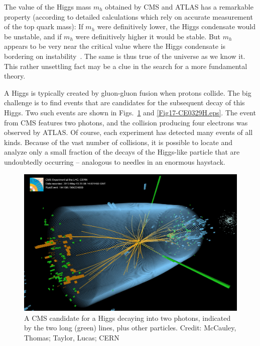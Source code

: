 \documentclass[12pt]{iopart}
\begin{document}
The value of the Higgs mass $m_h$ obtained by CMS and ATLAS has a remarkable property (according to detailed calculations which rely on accurate measurement of the top quark mass): If $m_h$ were definitively lower, the Higgs condensate would be unstable, and if $m_h$ were definitively higher it would be stable. But $m_h$ appears to be very near the critical value where the Higgs condensate is bordering on instability~\cite{Degrassi}. The same is thus true of the universe as we know it. This rather unsettling fact may be a clue in the search for a more fundamental theory. 

A Higgs is typically created by gluon-gluon fusion when protons collide. The big challenge is to find events that are candidates for the subsequent decay of this Higgs. Two such events are shown in Figs.~\ref{Fig16-CMS-gammas.eps} and \ref{Fig17-CE0329H.eps}. The event from CMS features two photons, and the collision producing four electrons was observed by ATLAS. Of course, each experiment has detected many events of all kinds. Because of the vast number of collisions, it is possible to locate and analyze only a small fraction of the decays of the Higgs-like particle that are undoubtedly occurring -- analogous to needles in an enormous haystack.
\begin{figure}[htbp]
\centering
\includegraphics[bb=0 0 360 240, width=5in]{Fig16-CMS-gammas.eps}
\caption{A CMS candidate for a Higgs decaying into two photons, indicated by the two long (green) lines, plus other particles. Credit: McCauley, Thomas; Taylor, Lucas; CERN \label{Fig16-CMS-gammas.eps}}
\end{figure}
\end{document}
